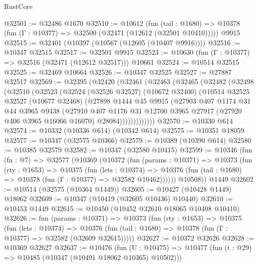 \begin{lexlean}{RustCore}
\begin{coremodule}
@32501 := @32486 @1670
@32510 := @10612
    (fun (tail : @1680) => @10378 (fun (Γ : @10377) => @32500 (@32471 (@12612 (@32501 @10410)))))
    @9915
@32515 := @32401 (@10397 (@10567 (@12605 (@10407 @9916))))
@32516 := @10347 @32515
@32517 := @32501 @9915
@32523 := @10630 (fun (Γ : @10377) => @32516 (@32471 (@12612 @32517))) @10661
@32524 := @10514 @32515
@32525 := @32469 @10664
@32526 := @10347 @32525
@32527 := @27887 @32517
@32569 := @32395
    (@32420
      (@32461
        (@32463
          (@32465
            (@32482
              (@32498
                (@32510
                  (@32523
                    (@32524
                      (@32526 @32527)
                      (@10672 @32400)
                      (@10514
                        @32525
                        @32527
                        (@10677 @32468)
                        (@27898
                          @1444
                          @45
                          @9915
                          (@27903
                            @407
                            @1174
                            @31
                            @44
                            @3965
                            @9438
                            (@27910
                              @407
                              @1176
                              @31
                              @12700
                              @3965
                              @27917
                              (@27920 @406 @3965 @16066 @16070)
                              @28084)))))))))))))
@32570 := @10330 @614
@32574 := @10332 (@10336 @614) (@10342 @614)
@32575 := @10351 @18059
@32577 := @10347 (@32575 @10366)
@32579 := @10389 (@10390 @614)
@32580 := @10385 @32579
@32582 := @10347 (@32580 @10415)
@32599 := @10346
    (fun (fn : @7) =>
    @32577
      (@10369
        (@10372
          (fun (params : @10371) =>
          @10373
            (fun (rty : @1653) =>
            @10375
              (fun (lets : @10374) =>
              @10376 (fun (tail : @1680) => @10378 (fun (Γ : @10377) => @32582 @10462))))))
        @10508))
    @1449
@32602 := @10514 (@32575 (@10364 @1449))
@32605 := @10427 (@10428 @1449) @18062
@32609 := @10347 (@10419 (@32605 @10436) @10440)
@32610 := @10453 @1449
@32615 := @10450 (@10452 @32610 @18065 @10408 @10410)
@32626 := fun (params : @10371) =>
  @10373
    (fun (rty : @1653) =>
    @10375
      (fun (lets : @10374) =>
      @10376 (fun (tail : @1680) => @10378 (fun (Γ : @10377) => @32582 (@32609 @32615)))))
@32627 := @10372 @32626
@32628 := @10369 @32627
@32637 := @10476
    (fun (U : @10475) => @10477 (fun (t : @29) => @10485 (@10347 (@10491 @18062 @10365) @10502)))

\end{coremodule}
\end{lexlean}
